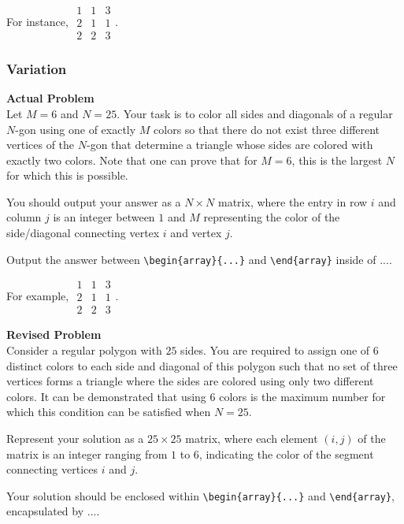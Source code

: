 For instance, $\boxed{\begin{array}{ccc}1 & 1 & 3 \\ 2 & 1 & 1 \\ 2 & 2 & 3\end{array}}$.

\subsubsection{Variation}
\textbf{Actual Problem}\\
Let $M = 6$ and $N = 25$. Your task is to color all sides and diagonals of a regular $N$-gon using one of exactly $M$ colors so that there do not exist three different vertices of the $N$-gon
that determine a triangle whose sides are colored with exactly two colors.
Note that one can prove that for $M = 6$, this is the largest $N$ for which this is possible.


You should output your answer as a ${N} \times {N}$ matrix, where the entry in row $i$ and column $j$ is an integer between $1$ and $M$ representing the color of the side/diagonal connecting vertex $i$ and vertex $j$.
 
Output the answer between \verb|\begin{array}{...}| and \verb|\end{array}| inside of $\boxed{...}$. 

For example, $\boxed{\begin{array}{ccc}1 & 1 & 3 \\ 2 & 1 & 1 \\ 2 & 2 & 3\end{array}}$.

\textbf{Revised Problem}\\
Consider a regular polygon with $25$ sides. You are required to assign one of $6$ distinct colors to each side and diagonal of this polygon such that no set of three vertices forms a triangle where the sides are colored using only two different colors. It can be demonstrated that using $6$ colors is the maximum number for which this condition can be satisfied when $N = 25$.

Represent your solution as a $25 \times 25$ matrix, where each element $(i, j)$ of the matrix is an integer ranging from $1$ to $6$, indicating the color of the segment connecting vertices $i$ and $j$.

Your solution should be enclosed within \verb|\begin{array}{...}| and \verb|\end{array}|, encapsulated by $\boxed{...}$.

